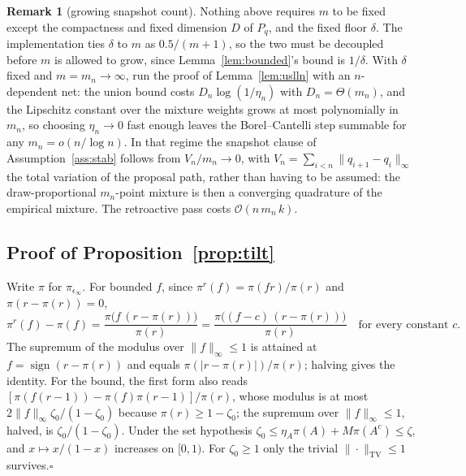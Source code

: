 \documentclass[10pt]{article}
\theoremstyle{plain}
\theoremstyle{definition}
\newtheorem{remark}{Remark}
\begin{document}
\begin{remark}[growing snapshot count]\label{rem:growing-m}
Nothing above requires $m$ to be fixed except the compactness and fixed dimension $D$ of $P_q$, and the fixed floor $\delta$. The implementation ties $\delta$ to $m$ as $0.5/(m{+}1)$, so the two must be decoupled before $m$ is allowed to grow, since Lemma~\ref{lem:bounded}'s bound is $1/\delta$. With $\delta$ fixed and $m=m_n\to\infty$, run the proof of Lemma~\ref{lem:uslln} with an $n$-dependent net: the union bound costs $D_n\log(1/\eta_n)$ with $D_n=\Theta(m_n)$, and the Lipschitz constant over the mixture weights grows at most polynomially in $m_n$, so choosing $\eta_n\to0$ fast enough leaves the Borel--Cantelli step summable for any $m_n=o(n/\log n)$. In that regime the snapshot clause of Assumption~\ref{ass:stab} follows from $V_n/m_n\to0$, with $V_n=\sum_{i<n}\|q_{i+1}-q_i\|_\infty$ the total variation of the proposal path, rather than having to be assumed: the draw-proportional $m_n$-point mixture is then a converging quadrature of the empirical mixture. The retroactive pass costs $\mathcal{O}(n\,m_n\,k)$.
\end{remark}

\subsection{Proof of Proposition~\ref{prop:tilt}}\label{app:theory-tilt}
Write $\pi$ for $\pi_{\epsilon_\infty}$. For bounded $f$, since $\pi^r(f)=\pi(fr)/\pi(r)$ and $\pi(r-\pi(r))=0$,
\[
\pi^r(f)-\pi(f)=\frac{\pi\bigl(f\,(r-\pi(r))\bigr)}{\pi(r)}
=\frac{\pi\bigl((f-c)\,(r-\pi(r))\bigr)}{\pi(r)}\quad\text{for every constant }c .
\]
The supremum of the modulus over $\|f\|_\infty\le1$ is attained at $f=\operatorname{sign}(r-\pi(r))$ and equals $\pi(|r-\pi(r)|)/\pi(r)$; halving gives the identity. For the bound, the first form also reads $[\pi(f(r-1))-\pi(f)\pi(r-1)]/\pi(r)$, whose modulus is at most $2\|f\|_\infty\zeta_0/(1-\zeta_0)$ because $\pi(r)\ge1-\zeta_0$; the supremum over $\|f\|_\infty\le1$, halved, is $\zeta_0/(1-\zeta_0)$. Under the set hypothesis $\zeta_0\le\eta_A\pi(A)+M\pi(A^c)\le\zeta$, and $x\mapsto x/(1-x)$ increases on $[0,1)$. For $\zeta_0\ge1$ only the trivial $\|\cdot\|_{\mathrm{TV}}\le1$ survives.\hfill$\square$
\end{document}
